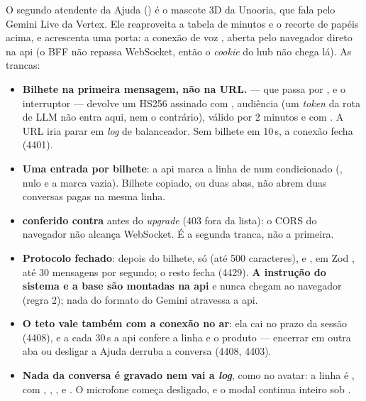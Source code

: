O segundo atendente da Ajuda () é o mascote 3D da Unooria, que fala
pelo Gemini Live da Vertex. Ele reaproveita a tabela de minutos e o recorte de
papéis acima, e acrescenta uma porta: a conexão de voz
, aberta pelo navegador direto na api (o BFF não
repassa WebSocket, então o \emph{cookie} do hub não chega lá). As trancas:

\begin{itemize}
  \item \textbf{Bilhete na primeira mensagem, não na URL.}  --- que passa por ,  e o
    interruptor --- devolve um HS256 assinado com ,
    audiência  (um \emph{token} da rota de LLM não entra
    aqui, nem o contrário), válido por 2 minutos e com . A URL iria parar em \emph{log} de balanceador. Sem bilhete
    em 10\,s, a conexão fecha (4401).
  \item \textbf{Uma entrada por bilhete}: a api marca a linha de
     num  condicionado (,  nulo e a marca vazia). Bilhete copiado, ou duas abas,
    não abrem duas conversas pagas na mesma linha.
  \item \textbf{ conferido contra } antes do
    \emph{upgrade} (403 fora da lista): o CORS do navegador não alcança
    WebSocket. É a segunda tranca, não a primeira.
  \item \textbf{Protocolo fechado}: depois do bilhete, só  (até 500
    caracteres),  e , em Zod , até 30
    mensagens por segundo; o resto fecha (4429). \textbf{A instrução do sistema
    e a base são montadas na api} e nunca chegam ao navegador (regra 2); nada do
    formato do Gemini atravessa a api.
  \item \textbf{O teto vale também com a conexão no ar}: ela cai no prazo da
    sessão (4408), e a cada 30\,s a api confere a linha e o produto ---
    encerrar em outra aba ou desligar a Ajuda derruba a conversa (4408, 4403).
  \item \textbf{Nada da conversa é gravado nem vai a \emph{log}}, como no avatar:
    a linha é , com , , ,
     e . O microfone começa desligado, e o modal continua
    inteiro sob .
\end{itemize}

